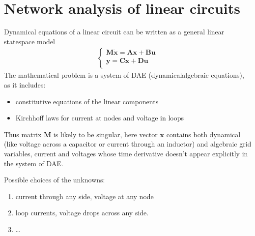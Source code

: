 \documentclass[letterpaper,10pt,english]{jupyterBook}
\begin{document}
\section{Network analysis of linear circuits}
\label{\detokenize{ch/electrical-engineering-networks:network-analysis-of-linear-circuits}}\label{\detokenize{ch/electrical-engineering-networks:classical-electromagnetism-electrical-engineering-newtork-analysis}}\label{\detokenize{ch/electrical-engineering-networks::doc}}
\sphinxAtStartPar
Dynamical equations of a linear circuit can be written as a general linear state\sphinxhyphen{}space model
\begin{equation*}
\begin{split}\begin{cases}
  \mathbf{M} \dot{\mathbf{x}} = \mathbf{A} \mathbf{x} + \mathbf{B} \mathbf{u} \\
  \mathbf{y} = \mathbf{C} \mathbf{x} + \mathbf{D} \mathbf{u} \\
\end{cases}\end{split}
\end{equation*}
\sphinxAtStartPar
The mathematical problem is a system of DAE (dynamical\sphinxhyphen{}algebraic equations), as it includes:
\begin{itemize}
\item {} 
\sphinxAtStartPar
constitutive equations of the linear components

\item {} 
\sphinxAtStartPar
Kirchhoff laws for current at nodes and voltage in loops

\end{itemize}

\sphinxAtStartPar
Thus matrix \(\mathbf{M}\) is likely to be singular, here vector \(\mathbf{x}\) contains both dynamical (like voltage across a capacitor or current through an inductor) and algebraic grid variables, current and voltages whose time derivative doesn’t appear explicitly in the system of DAE.

\sphinxAtStartPar
{} Possible choices of the unknowns:
\begin{enumerate}
%
\item {} 
\sphinxAtStartPar
current through any side, voltage at any node

\item {} 
\sphinxAtStartPar
loop currents, voltage drops across any side.

\item {} 
\sphinxAtStartPar
… 

\end{enumerate}
\end{document}
